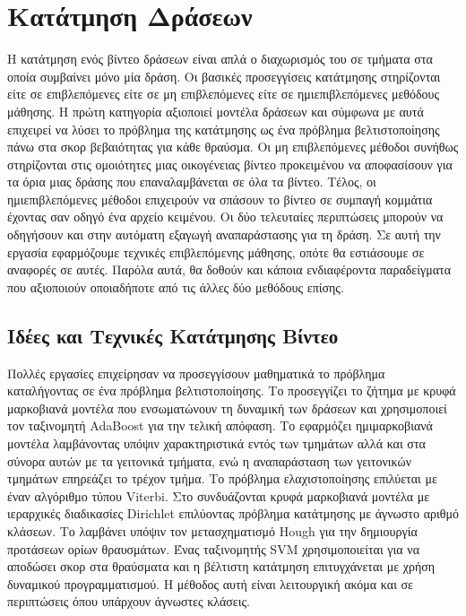 \documentclass[11pt,a4paper,english,greek,twoside]{../Thesis}
\begin{document}
\chapter{Κατάτμηση Δράσεων}
Η κατάτμηση ενός βίντεο δράσεων είναι απλά ο διαχωρισμός του σε τμήματα στα οποία συμβαίνει μόνο μία δράση. Οι βασικές προσεγγίσεις κατάτμησης στηρίζονται είτε σε επιβλεπόμενες είτε σε μη επιβλεπόμενες είτε σε ημιεπιβλεπόμενες μεθόδους μάθησης. Η πρώτη κατηγορία αξιοποιεί μοντέλα δράσεων και σύμφωνα με αυτά επιχειρεί να λύσει το πρόβλημα της κατάτμησης ως ένα πρόβλημα βελτιστοποίησης πάνω στα σκορ βεβαιότητας για κάθε θραύσμα. Οι μη επιβλεπόμενες μέθοδοι συνήθως στηρίζονται στις ομοιότητες μιας οικογένειας βίντεο προκειμένου να αποφασίσουν για τα όρια μιας δράσης που επαναλαμβάνεται σε όλα τα βίντεο. Τέλος, οι ημιεπιβλεπόμενες μέθοδοι επιχειρούν να σπάσουν το βίντεο σε συμπαγή κομμάτια έχοντας σαν οδηγό ένα αρχείο κειμένου. Οι δύο τελευταίες περιπτώσεις μπορούν να οδηγήσουν και στην αυτόματη εξαγωγή αναπαράστασης για τη δράση. Σε αυτή την εργασία εφαρμόζουμε τεχνικές επιβλεπόμενης μάθησης, οπότε θα εστιάσουμε σε αναφορές σε αυτές. Παρόλα αυτά, θα δοθούν και κάποια ενδιαφέροντα παραδείγματα που αξιοποιούν οποιαδήποτε από τις άλλες δύο μεθόδους επίσης.


\section{Ιδέες και Τεχνικές Κατάτμησης Βίντεο}
Πολλές εργασίες επιχείρησαν να προσεγγίσουν μαθηματικά το πρόβλημα καταλήγοντας σε ένα πρόβλημα βελτιστοποίησης. Το \cite{lv_2006} προσεγγίζει το ζήτημα με κρυφά μαρκοβιανά μοντέλα που ενσωματώνουν τη δυναμική των δράσεων και χρησιμοποιεί τον ταξινομητή AdaBoost για την τελική απόφαση. Το \cite{shi_2008} εφαρμόζει ημιμαρκοβιανά μοντέλα λαμβάνοντας υπόψιν χαρακτηριστικά εντός των τμημάτων αλλά και στα σύνορα αυτών με τα γειτονικά τμήματα, ενώ η αναπαράσταση των γειτονικών τμημάτων επηρεάζει το τρέχον τμήμα. Το πρόβλημα ελαχιστοποίησης επιλύεται με έναν αλγόριθμο τύπου Viterbi. Στο \cite{bargi_2012} συνδυάζονται κρυφά μαρκοβιανά μοντέλα με ιεραρχικές διαδικασίες Dirichlet επιλύοντας πρόβλημα κατάτμησης με άγνωστο αριθμό κλάσεων. Το \cite{kosmopoulos_2014} λαμβάνει υπόψιν τον μετασχηματισμό Hough για την δημιουργία προτάσεων ορίων θραυσμάτων. Ένας ταξινομητής SVM χρησιμοποιείται για να αποδώσει σκορ στα θραύσματα και η βέλτιστη κατάτμηση επιτυγχάνεται με χρήση δυναμικού προγραμματισμού. Η μέθοδος αυτή είναι λειτουργική ακόμα και σε περιπτώσεις όπου υπάρχουν άγνωστες κλάσεις.
\end{document}
